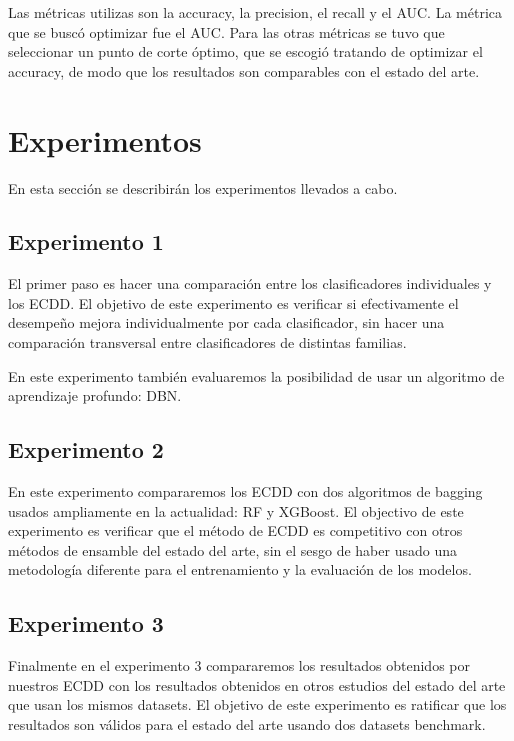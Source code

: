 Las métricas utilizas son la accuracy, la precision, el recall y el AUC. La métrica que se buscó optimizar fue el AUC. Para las otras métricas se tuvo que seleccionar un punto de corte óptimo, que se escogió tratando de optimizar el accuracy, de modo que los resultados son comparables con el estado del arte.

\section{Experimentos}

En esta sección se describirán los experimentos llevados a cabo.

\subsection{Experimento 1}

El primer paso es hacer una comparación entre los clasificadores individuales y los \ac{ECDD}. El objetivo de este experimento es verificar si efectivamente el desempeño mejora individualmente por cada clasificador, sin hacer una comparación transversal entre clasificadores de distintas familias.

En este experimento también evaluaremos la posibilidad de usar un algoritmo de aprendizaje profundo: \ac{DBN}.

\subsection{Experimento 2}

En este experimento compararemos los \ac{ECDD} con dos algoritmos de bagging usados ampliamente en la actualidad: \ac{RF} y \ac{XGBoost}. El objectivo de este experimento es verificar que el método de \ac{ECDD} es competitivo con otros métodos de ensamble del estado del arte, sin el sesgo de haber usado una metodología diferente para el entrenamiento y la evaluación de los modelos.

\subsection{Experimento 3}

Finalmente en el experimento 3 compararemos los resultados obtenidos por nuestros \ac{ECDD} con los resultados obtenidos en otros estudios del estado del arte que usan los mismos datasets. El objetivo de este experimento es ratificar que los resultados son válidos para el estado del arte usando dos datasets benchmark.
